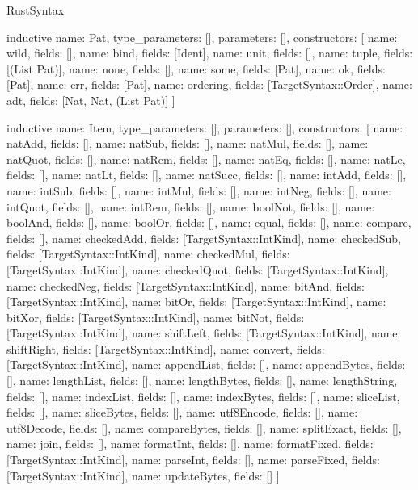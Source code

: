 \begin{lexlean}{RustSyntax}
\begin{semanticmodule}
inductive{
  name: Pat,
  type_parameters: [],
  parameters: [],
  constructors: [
    {name: wild, fields: []},
    {name: bind, fields: [Ident]},
    {name: unit, fields: []},
    {name: tuple, fields: [(List Pat)]},
    {name: none, fields: []},
    {name: some, fields: [Pat]},
    {name: ok, fields: [Pat]},
    {name: err, fields: [Pat]},
    {name: ordering, fields: [TargetSyntax::Order]},
    {name: adt, fields: [Nat, Nat, (List Pat)]}
  ]
}

inductive{
  name: Item,
  type_parameters: [],
  parameters: [],
  constructors: [
    {name: natAdd, fields: []},
    {name: natSub, fields: []},
    {name: natMul, fields: []},
    {name: natQuot, fields: []},
    {name: natRem, fields: []},
    {name: natEq, fields: []},
    {name: natLe, fields: []},
    {name: natLt, fields: []},
    {name: natSucc, fields: []},
    {name: intAdd, fields: []},
    {name: intSub, fields: []},
    {name: intMul, fields: []},
    {name: intNeg, fields: []},
    {name: intQuot, fields: []},
    {name: intRem, fields: []},
    {name: boolNot, fields: []},
    {name: boolAnd, fields: []},
    {name: boolOr, fields: []},
    {name: equal, fields: []},
    {name: compare, fields: []},
    {name: checkedAdd, fields: [TargetSyntax::IntKind]},
    {name: checkedSub, fields: [TargetSyntax::IntKind]},
    {name: checkedMul, fields: [TargetSyntax::IntKind]},
    {name: checkedQuot, fields: [TargetSyntax::IntKind]},
    {name: checkedNeg, fields: [TargetSyntax::IntKind]},
    {name: bitAnd, fields: [TargetSyntax::IntKind]},
    {name: bitOr, fields: [TargetSyntax::IntKind]},
    {name: bitXor, fields: [TargetSyntax::IntKind]},
    {name: bitNot, fields: [TargetSyntax::IntKind]},
    {name: shiftLeft, fields: [TargetSyntax::IntKind]},
    {name: shiftRight, fields: [TargetSyntax::IntKind]},
    {name: convert, fields: [TargetSyntax::IntKind]},
    {name: appendList, fields: []},
    {name: appendBytes, fields: []},
    {name: lengthList, fields: []},
    {name: lengthBytes, fields: []},
    {name: lengthString, fields: []},
    {name: indexList, fields: []},
    {name: indexBytes, fields: []},
    {name: sliceList, fields: []},
    {name: sliceBytes, fields: []},
    {name: utf8Encode, fields: []},
    {name: utf8Decode, fields: []},
    {name: compareBytes, fields: []},
    {name: splitExact, fields: []},
    {name: join, fields: []},
    {name: formatInt, fields: []},
    {name: formatFixed, fields: [TargetSyntax::IntKind]},
    {name: parseInt, fields: []},
    {name: parseFixed, fields: [TargetSyntax::IntKind]},
    {name: updateBytes, fields: []}
  ]
}


\end{semanticmodule}
\end{lexlean}
